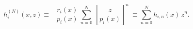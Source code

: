 \begin{equation}
h^{(N)}_i(x,z) \equiv -\frac{r_i(x)}{p_i(x)}\,
\sum_{n=0}^N\, {\left[ \frac{z}{p_i(x)} \right]}^n\ 
\equiv \sum_{n=0}^{N} h_{i,n}(x) \, z^n .
\label{1.19}
\end{equation}

